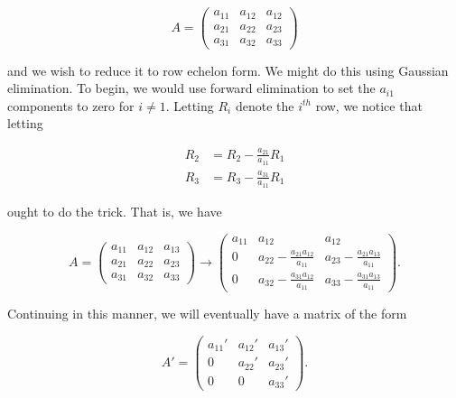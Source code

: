 \documentclass[12pt]{article}
\numberwithin{equation}{section}
\begin{document}
\begin{equation}
A = \left(
\begin{array}{ccc}
a_{11} & a_{12} & a_{12} \\
a_{21} & a_{22} & a_{23} \\
a_{31} & a_{32} & a_{33}
\end{array}
\right)
\end{equation}

\noindent and we wish to reduce it to row echelon form.  We might do this using Gaussian elimination.  To begin, we would use forward elimination to set the $a_{i1}$ components to zero for $i\neq1$.  Letting $R_{i}$ denote the $i^{th}$ row, we notice that letting 

\begin{equation}
\label{eq:rowops1}
\begin{align}
R_{2} & = R_{2} - \frac{a_{21}}{a_{11}}R_{1} \\
R_{3} & = R_{3} - \frac{a_{31}}{a_{11}}R_{1}
\end{align}
\end{equation}

\noindent ought to do the trick.  That is, we have 

\begin{equation}
A = \left(
\begin{array}{ccc}
a_{11} & a_{12} & a_{13} \\
a_{21} & a_{22} & a_{23} \\
a_{31} & a_{32} & a_{33}
\end{array}
\right) \rightarrow \left(
\begin{array}{ccc}
a_{11} & a_{12} & a_{12} \\
0 & a_{22} - \frac{a_{21}a_{12}}{a_{11}} & a_{23} - \frac{a_{21}a_{13}}{a_{11}} \\
0 & a_{32} - \frac{a_{31}a_{12}}{a_{11}} & a_{33} - \frac{a_{31}a_{13}}{a_{11}}
\end{array}\right).
\end{equation}

\noindent Continuing in this manner, we will eventually have a matrix of the form 

\begin{equation}
A\prime = \left(
\begin{array}{ccc}
a_{11}\prime & a_{12}\prime & a_{13}\prime \\
0 & a_{22}\prime & a_{23}\prime \\
0 & 0 & a_{33}\prime
\end{array}\right).
\end{equation}
\end{document}
